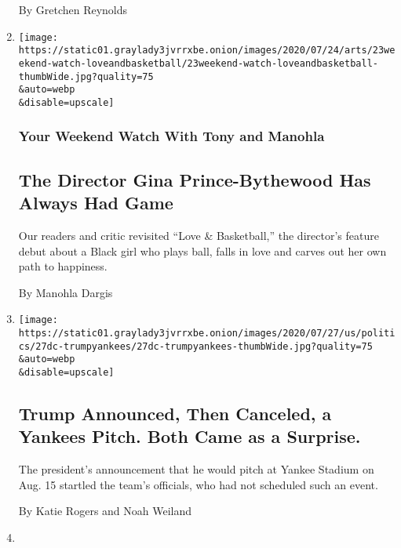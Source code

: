 \begin{enumerate}
  By Gretchen Reynolds
\item
  \href{/2020/07/28/movies/love-basketball-viewing-party.html}{}

  \texttt{[image: https://static01.graylady3jvrrxbe.onion/images/2020/07/24/arts/23weekend-watch-loveandbasketball/23weekend-watch-loveandbasketball-thumbWide.jpg?quality=75\\\&auto=webp\\\&disable=upscale]}

  \hypertarget{your-weekend-watch-with-tony-and-manohla}{%
  \subsubsection{Your Weekend Watch With Tony and
  Manohla}\label{your-weekend-watch-with-tony-and-manohla}}

  \hypertarget{the-director-gina-prince-bythewood-has-always-had-game}{%
  \subsection{The Director Gina Prince-Bythewood Has Always Had
  Game}\label{the-director-gina-prince-bythewood-has-always-had-game}}

  Our readers and critic revisited ``Love \& Basketball,'' the
  director's feature debut about a Black girl who plays ball, falls in
  love and carves out her own path to happiness.

  By Manohla Dargis
\item
  \href{/2020/07/27/us/politics/trump-yankees-fauci.html}{}

  \texttt{[image: https://static01.graylady3jvrrxbe.onion/images/2020/07/27/us/politics/27dc-trumpyankees/27dc-trumpyankees-thumbWide.jpg?quality=75\\\&auto=webp\\\&disable=upscale]}

  \hypertarget{trump-announced-then-canceled-a-yankees-pitch-both-came-as-a-surprise}{%
  \subsection{Trump Announced, Then Canceled, a Yankees Pitch. Both Came
  as a
  Surprise.}\label{trump-announced-then-canceled-a-yankees-pitch-both-came-as-a-surprise}}

  The president's announcement that he would pitch at Yankee Stadium on
  Aug. 15 startled the team's officials, who had not scheduled such an
  event.

  By Katie Rogers and Noah Weiland
\item
  \href{/2020/07/27/sports/hockey/eddie-shack-feisty-wing-for-powerful-maple-leafs-dies-at-83.html}{}


\end{enumerate}
